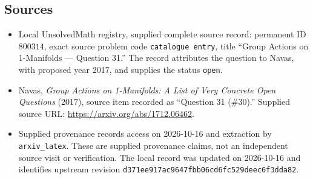 \documentclass[11pt]{article}
\begin{document}
\subsection{Sources}
\begin{itemize}
\item Local UnsolvedMath registry, supplied complete source record: permanent ID \(800314\), exact source problem code \texttt{catalogue entry}, title ``Group Actions on 1-Manifolds --- Question 31.'' The record attributes the question to Navas, with proposed year 2017, and supplies the status \texttt{open}.
\item Navas, \emph{Group Actions on 1-Manifolds: A List of Very Concrete Open Questions} (2017), source item recorded as ``Question 31 (\#30).'' Supplied source URL: \url{https://arxiv.org/abs/1712.06462}.
\item Supplied provenance records access on 2026-10-16 and extraction by \texttt{arxiv\_latex}. These are supplied provenance claims, not an independent source visit or verification. The local record was updated on 2026-10-16 and identifies upstream revision \texttt{d371ee917ac9647fbb06cd6fc529deec6f3dda82}.
\end{itemize}
\end{document}
